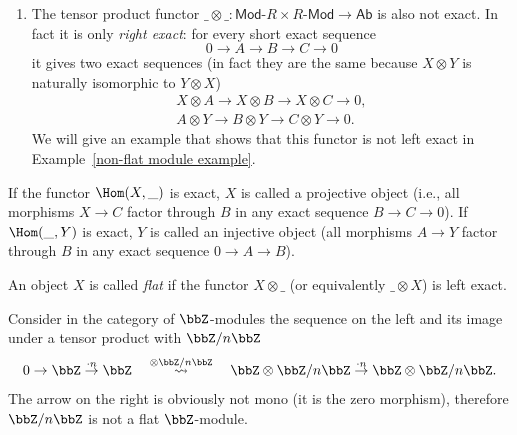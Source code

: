 \begin{example}
\begin{enumerate}
        An analogous example for the first line is
        \[\begin{tikzcd}
        B=\bbZ\arrow[r,"\mod n"] & C=\bbZ/n\bbZ\arrow[r] & 0 \\
         &X=\bbZ/n\bbZ\arrow[ul,dashed,"?"]\arrow[u,
        "\id"] &
        \end{tikzcd}\]
        If this functor were to be surjective on Hom-sets, every map $X\to C$ would have to come from a map $X\to B$, which is clearly false in this case.
        \item The tensor product functor $\_\otimes\_:\mathsf{Mod}\text{-}R\times R\text{-}\mathsf{Mod}\to \mathsf{Ab}$ is also not exact. In fact it is only \emph{right exact}: for every short exact sequence
        \[0\to A\to B\to C\to 0\]
        it gives two exact sequences (in fact they are the same because $X\otimes Y$ is naturally isomorphic to $Y\otimes X$)
        \begin{eqnarray} 
        X\otimes A\to X\otimes B\to X\otimes C\to 0,\\
        A\otimes Y\to B\otimes Y\to C\otimes Y\to 0.
        \end{eqnarray}
        We will give an example that shows that this functor is not left exact in Example~\ref{non-flat module example}.
    \end{enumerate}
\end{example}


\begin{defn}
    If the functor $\Hom(X,\_)$ is exact, $X$ is called a projective object (i.e., all morphisms $X\to C$ factor through $B$ in any exact sequence $B\to C\to 0$). If $\Hom(\_,Y)$ is exact, $Y$ is called an injective object (all morphisms $A\to Y$ factor through $B$ in any exact sequence $0\to A\to B$).
\end{defn}

\begin{defn}
    An object $X$ is called \emph{flat} if the functor $X\otimes\_$ (or equivalently $\_\otimes X$) is left exact.
\end{defn}

\begin{example}\label{non-flat module example}
    Consider in the category of $\bbZ$-modules the sequence on the left and its image under a tensor product with $\bbZ/n\bbZ$
    \[0\to \bbZ\overset{\cdot n}\to \bbZ \quad \overset{\otimes\bbZ/n\bbZ}\rightsquigarrow \quad \bbZ\otimes \bbZ/n\bbZ\overset{\cdot n}\to\bbZ\otimes \bbZ/n\bbZ.\]
    The arrow on the right is obviously not mono (it is the zero morphism), therefore $\bbZ/n\bbZ$ is not a flat $\bbZ$-module.
\end{example}


